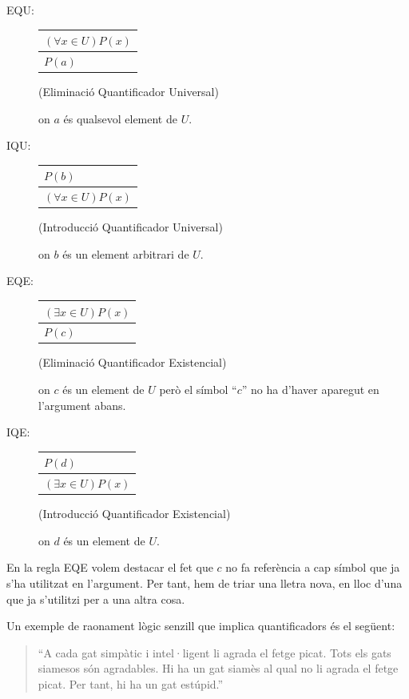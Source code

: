 \begin{description}
\item[EQU:]
\begin{tabular}{l}
$\left( \forall x\in U\right) P(x)$ \\ \hline
$P(a)$\end{tabular}
(Eliminació Quantificador Universal)

on $a$ és qualsevol element de $U$.

\item[IQU:]
\begin{tabular}{l}
$P(b)$ \\ \hline
$\left( \forall x\in U\right) P(x)$\end{tabular}
(Introducció Quantificador Universal)

on $b$ és un element arbitrari de $U$.

\item[EQE:]
\begin{tabular}{l}
$\left( \exists x\in U\right) P(x)$ \\ \hline
$P(c)$\end{tabular}
(Eliminació Quantificador Existencial)

on $c$ és un element de $U$ però el símbol \enquote{$c$} no ha d'haver
aparegut en l'argument abans.

\item[IQE:]
\begin{tabular}{l}
$P(d)$ \\ \hline
$\left( \exists x\in U\right) P(x)$\end{tabular}
(Introducció Quantificador Existencial)

on $d$ és un element de $U$.
\end{description}

En la regla EQE volem destacar el fet que $c$ no fa referència a cap símbol que ja s'ha utilitzat en l'argument. Per tant, hem de triar una
lletra nova, en lloc d'una que ja s'utilitzi per a una altra cosa.

\bigskip

Un exemple de raonament lògic senzill que implica quantificadors és
el següent:

\begin{quote}
\enquote{A cada gat simpàtic i intel·ligent li agrada el
fetge picat. Tots els gats siamesos són agradables. Hi ha un gat siamès al qual no li agrada el fetge picat. Per tant, hi ha un gat estúpid.}
\end{quote}

